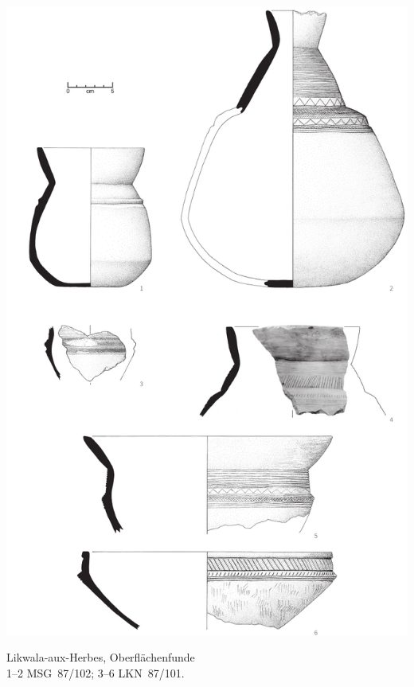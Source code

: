 \begin{pl}[H]
	\includegraphics{plt/Taf86.pdf}
	\vspace{.75em}\caption{Likwala-aux-Herbes, Oberflächenfunde \\ 1--2 MSG~87/102; 3--6 LKN~87/101.}
	\label{pl:86}
\end{pl}

